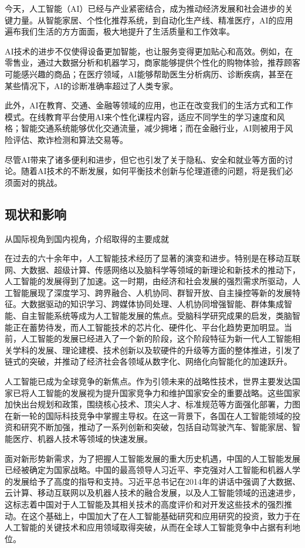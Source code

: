 今天，人工智能（AI）已经与产业紧密结合，成为推动经济发展和社会进步的关键力量。从智能家居、个性化推荐系统，到自动化生产线、精准医疗，AI的应用遍布我们生活的方方面面，极大地提升了生活质量和工作效率。

AI技术的进步不仅使得设备更加智能，也让服务变得更加贴心和高效。例如，在零售业，通过大数据分析和机器学习，商家能够提供个性化的购物体验，推荐顾客可能感兴趣的商品；在医疗领域，AI能够帮助医生分析病历、诊断疾病，甚至在某些情况下，AI的诊断准确率超过了人类专家。

此外，AI在教育、交通、金融等领域的应用，也正在改变我们的生活方式和工作模式。在线教育平台使用AI来个性化课程内容，适应不同学生的学习速度和风格；智能交通系统能够优化交通流量，减少拥堵；而在金融行业，AI则被用于风险评估、欺诈检测和算法交易等。

尽管AI带来了诸多便利和进步，但它也引发了关于隐私、安全和就业等方面的讨论。随着AI技术的不断发展，如何平衡技术创新与伦理道德的问题，将是我们必须面对的挑战。

\subsection{现状和影响}
从国际视角到国内视角，介绍取得的主要成就

在过去的六十余年中，人工智能技术经历了显著的演变和进步。特别是在移动互联网、大数据、超级计算、传感网络以及脑科学等领域的新理论和新技术的推动下，人工智能的发展得到了加速。这一时期，由经济和社会发展的强烈需求所驱动，人工智能展现了深度学习、跨界融合、人机协同、群智开放、自主操控等新的发展特征。大数据驱动的知识学习、跨媒体协同处理、人机协同增强智能、群体集成智能、自主智能系统等成为人工智能发展的焦点。受脑科学研究成果的启发，类脑智能正在蓄势待发，而人工智能技术的芯片化、硬件化、平台化趋势更加明显。当前，人工智能的发展已经进入了一个新的阶段，这个阶段特征为新一代人工智能相关学科的发展、理论建模、技术创新以及软硬件的升级等方面的整体推进，引发了链式的突破，并推动了经济社会各领域从数字化、网络化向智能化的加速跃升。

人工智能已成为全球竞争的新焦点。作为引领未来的战略性技术，世界主要发达国家已将人工智能的发展视为提升国家竞争力和维护国家安全的重要战略。这些国家加快出台规划和政策，围绕核心技术、顶尖人才、标准规范等方面强化部署，力图在新一轮的国际科技竞争中掌握主导权。在这一背景下，各国在人工智能领域的投资和研究不断加强，推动了一系列创新和突破，包括自动驾驶汽车、智能家居、智能医疗、机器人技术等领域的快速发展。

面对新形势新需求，为了把握人工智能发展的重大历史机遇，中国的人工智能发展已经被确定为国家战略。中国的最高领导人习近平、李克强对人工智能和机器人学的发展给予了高度的指导和支持。习近平总书记在2014年的讲话中强调了大数据、云计算、移动互联网以及机器人技术的融合发展，以及人工智能领域的迅速进步，这标志着中国对于人工智能及其相关技术的高度评价和对开发这些技术的强烈推动。在这个基础上，中国加大了在人工智能基础研究和应用研究的投资，致力于在人工智能的关键技术和应用领域取得突破，从而在全球人工智能竞争中占据有利地位。

